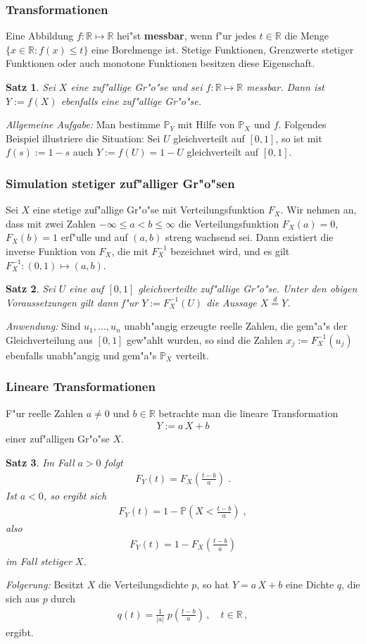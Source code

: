 \documentclass[ngerman,draft,parskip=half,twoside]{scrartcl}
\newtheorem{thm}{Satz}[section]
\newcommand*{\R}{\mathbb{R}}      %
\newcommand*{\WKM}{\mathbb{P}}      %
\begin{document}
\subsubsection{Transformationen}
Eine Abbildung $f\colon\R\mapsto\R$ hei"st \textbf{messbar}, wenn f"ur jedes $t\in\R$ die
Menge $\{x\in \R \colon f(x)\le t\}$ eine Borelmenge ist. Stetige Funktionen, Grenzwerte stetiger
Funktionen oder auch monotone Funktionen besitzen diese Eigenschaft.
\begin{thm}
Sei $X$ eine zuf"allige Gr"o"se und sei $f\colon\R\mapsto\R$ messbar. Dann ist $Y:=f(X)$ ebenfalls
eine zuf"allige Gr"o"se.
\end{thm}
\textit{Allgemeine Aufgabe:} Man bestimme $\WKM_Y$ mit Hilfe von $\WKM_X$ und $f$.
Folgendes Beispiel illustriere die Situation: Sei $U$ gleichverteilt auf $[0,1]$, so ist mit
$f(s):=1-s$ auch $Y:=f(U)=1-U$ gleichverteilt auf $[0,1]$.
\subsubsection{Simulation stetiger zuf"alliger Gr"o"sen}
Sei $X$ eine stetige zuf"allige Gr"o"se mit Verteilungsfunktion $F_X$. Wir nehmen an,
dass mit zwei Zahlen
$-\infty\le a<b\le\infty$ die Verteilungsfunktion $F_X(a)=0$, $F_X(b)=1$ erf"ulle  und
auf $(a,b)$ streng wachsend sei. Dann
existiert die inverse Funktion von $F_X$, die mit $F_X^{-1}$ bezeichnet wird, und es
gilt $F_X^{-1}\colon(0,1)\mapsto (a,b)$.
\begin{thm}
Sei $U$ eine auf $[0,1]$ gleichverteilte zuf"allige Gr"o"se. Unter den
obigen Voraussetzungen gilt dann f"ur $Y:=F_X^{-1}(U)$ die Aussage
$X\stackrel{d}{=} Y$.
\end{thm}
\textit{Anwendung:} Sind $u_1,\ldots,u_n$ unabh"angig erzeugte reelle Zahlen, die gem"a"s der
Gleichverteilung aus $[0,1]$ gew"ahlt wurden, so sind die Zahlen $x_j:= F_X^{-1}(u_j)$ ebenfalls unabh"angig
und gem"a"s $\WKM_X$ verteilt.
\subsubsection{Lineare Transformationen}
F"ur reelle Zahlen $a\not=0$ und $b\in\R$ betrachte man die lineare Transformation
\begin{gather*}
  Y:=a\,X+ b
\end{gather*}
einer zuf"alligen Gr"o"se $X$.
\begin{thm}
Im Fall $a>0$ folgt
  \begin{gather*}
    F_Y(t)=F_X\left(\frac{t-b}{a}\right)\;.
  \end{gather*}
Ist $a<0$, so ergibt sich
  \begin{gather*}
    F_Y(t)=1-\WKM\left(X<\frac{t-b}{a}\right)\;,
  \end{gather*}
also
  \begin{gather*}
    F_Y(t)=1-F_X\left(\frac{t-b}{a}\right)
  \end{gather*}
im Fall stetiger $X$.
\end{thm}
\textit{Folgerung:} Besitzt $X$ die Verteilungsdichte $p$, so hat $Y=a\,X+b$ eine Dichte $q$,
die sich aus $p$ durch
\begin{gather*}
  q(t)=\frac{1}{|a|}\;p\left(\frac{t-b}{a}\right)\,,\quad t\in\R\,,
\end{gather*}
ergibt.
\end{document}
